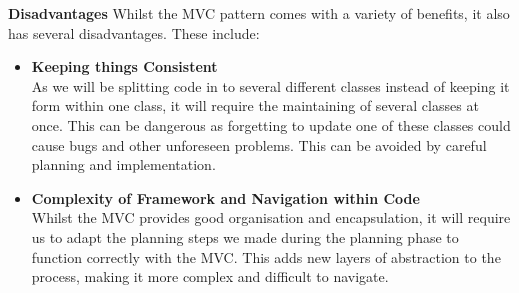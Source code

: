 \documentclass[a4paper]{article}
\begin{document}
\textbf{Disadvantages}
Whilst the MVC pattern comes with a variety of benefits, it also has several disadvantages. These include:
\begin{itemize}
    \item \textbf{Keeping things Consistent} \\
    As we will be splitting code in to several different classes instead of keeping it form within one class, it will require the maintaining of several classes at once. This can be dangerous as forgetting to update one of these classes could cause bugs and other unforeseen problems. This can be avoided by careful planning and implementation. \\
    \item \textbf{Complexity of Framework and Navigation within Code} \\
    Whilst the MVC provides good organisation and encapsulation, it will require us to adapt the planning steps we made during the planning phase to function correctly with the MVC. This adds new layers of abstraction to the process, making it more complex and difficult to navigate.
\end{itemize}
\end{document}
